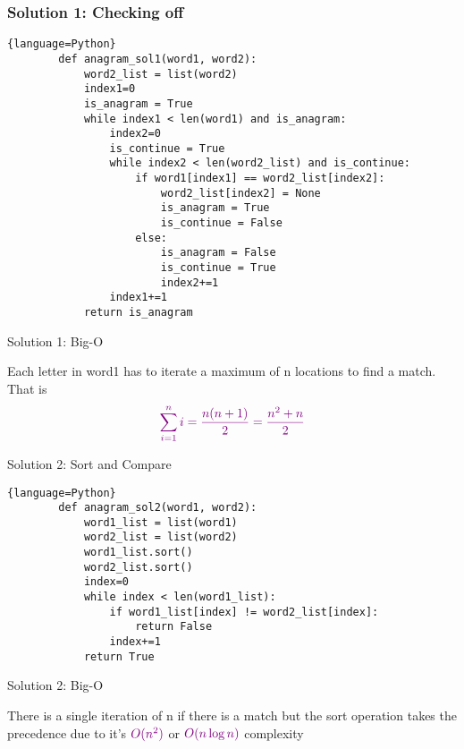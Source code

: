 \documentclass{beamer}
\begin{document}
\begin{frame}[fragile]
    \frametitle{Solution 1: Checking off }
    \begin{lstlisting}{language=Python}
        def anagram_sol1(word1, word2):
            word2_list = list(word2)
            index1=0
            is_anagram = True
            while index1 < len(word1) and is_anagram:
                index2=0
                is_continue = True
                while index2 < len(word2_list) and is_continue:
                    if word1[index1] == word2_list[index2]:
                        word2_list[index2] = None 
                        is_anagram = True
                        is_continue = False
                    else:
                        is_anagram = False
                        is_continue = True
                        index2+=1
                index1+=1
            return is_anagram       
    \end{lstlisting}
\end{frame}
\begin{frame}{Solution 1: Big-O}
    \begin{example}{}
        Each letter in word1 has to iterate a maximum of n locations to find a match. That is 
        \[ \color{violet} \sum_{i=1}^{n} i  = \frac{n(n+1)}{2} = \frac{n^{2} + n}{2} \]
        
    \end{example}
    
\end{frame}
\begin{frame}[fragile]{Solution 2: Sort and Compare}
    \begin{lstlisting}{language=Python}
        def anagram_sol2(word1, word2):
            word1_list = list(word1)
            word2_list = list(word2)
            word1_list.sort()
            word2_list.sort()
            index=0
            while index < len(word1_list):
                if word1_list[index] != word2_list[index]:
                    return False
                index+=1
            return True
    \end{lstlisting}
    
\end{frame}
\begin{frame}{Solution 2: Big-O}
    \begin{block}{}
        There is a single iteration of n if there is a match but the sort operation takes the precedence due to it's $\color{violet}O(n^{2})$ or $\color{violet}O(n\log n)$ complexity          
    \end{block}
    
\end{frame}
\end{document}
